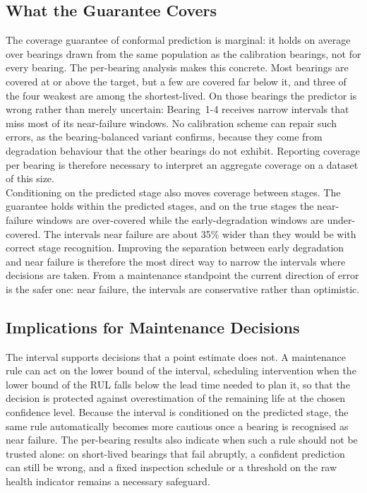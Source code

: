 \subsection{What the Guarantee Covers}

The coverage guarantee of conformal prediction is marginal: it holds on
average over bearings drawn from the same population as the
calibration bearings, not for every bearing. The per-bearing analysis
makes this concrete. Most bearings are covered at or above the target,
but a few are covered far below it, and three of the four weakest are
among the shortest-lived. On those bearings the predictor is wrong
rather than merely uncertain: Bearing~1-4 receives narrow intervals
that miss most of its near-failure windows. No calibration scheme can
repair such errors, as the bearing-balanced variant confirms, because
they come from degradation behaviour that the other bearings do not
exhibit. Reporting coverage per bearing is therefore necessary to
interpret an aggregate coverage on a dataset of this size.\\

Conditioning on the predicted stage also moves coverage between stages.
The guarantee holds within the predicted stages, and on the true stages
the near-failure windows are over-covered while the early-degradation
windows are under-covered. The intervals near failure are about 35\%
wider than they would be with correct stage recognition. Improving the
separation between early degradation and near failure is therefore the
most direct way to narrow the intervals where decisions are taken. From
a maintenance standpoint the current direction of error is the safer
one: near failure, the intervals are conservative rather than
optimistic.

\subsection{Implications for Maintenance Decisions}

The interval supports decisions that a point estimate does not. A
maintenance rule can act on the lower bound of the interval, scheduling
intervention when the lower bound of the RUL falls below the lead time
needed to plan it, so that the decision is protected against
overestimation of the remaining life at the chosen confidence level.
Because the interval is conditioned on the predicted stage, the same
rule automatically becomes more cautious once a bearing is recognised
as near failure. The per-bearing results also indicate when such a rule
should not be trusted alone: on short-lived bearings that fail
abruptly, a confident prediction can still be wrong, and a fixed
inspection schedule or a threshold on the raw health indicator remains
a necessary safeguard.


